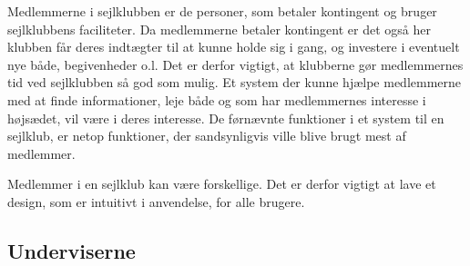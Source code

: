 Medlemmerne i sejlklubben er de personer, som betaler kontingent og bruger sejlklubbens faciliteter.
Da medlemmerne betaler kontingent er det også her klubben får deres indtægter til at kunne holde sig i gang, og investere i eventuelt nye både, begivenheder o.l. 
Det er derfor vigtigt, at klubberne gør medlemmernes tid ved sejlklubben så god som mulig. 
Et system der kunne hjælpe medlemmerne med at finde informationer, leje både og som har medlemmernes interesse i højsædet, vil være i deres interesse. 
De førnævnte funktioner i et system til en sejlklub, er netop funktioner, der sandsynligvis ville blive brugt mest af medlemmer.

Medlemmer i en sejlklub kan være forskellige.
Det er derfor vigtigt at lave et design, som er intuitivt i anvendelse, for alle brugere.





\subsection{Underviserne}


